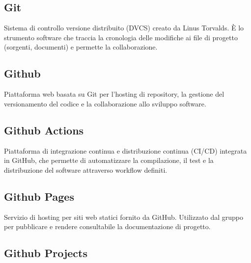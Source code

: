 \documentclass[a4paper, 11pt, oneside]{scrartcl} %
\begin{document}

\subsection*{Git}


Sistema di controllo versione distribuito (DVCS) creato da Linus Torvalds.
È lo strumento software che traccia la cronologia delle modifiche ai file di progetto (sorgenti, documenti) e permette la collaborazione.

\vspace{0.5cm}

\subsection*{Github}


Piattaforma web basata su Git per l'hosting di repository, la gestione del versionamento del codice e la collaborazione allo sviluppo software.

\vspace{0.5cm}

\subsection*{Github Actions}
Piattaforma di integrazione continua e distribuzione continua (CI/CD) integrata in GitHub, che permette di automatizzare la compilazione, il test e la distribuzione del software attraverso workflow definiti.
\vspace{0.5cm}

\subsection*{Github Pages}


Servizio di hosting per siti web statici fornito da GitHub. Utilizzato dal gruppo per pubblicare e rendere consultabile la documentazione di progetto.

\vspace{0.5cm}

\subsection*{Github Projects}
\end{document}
